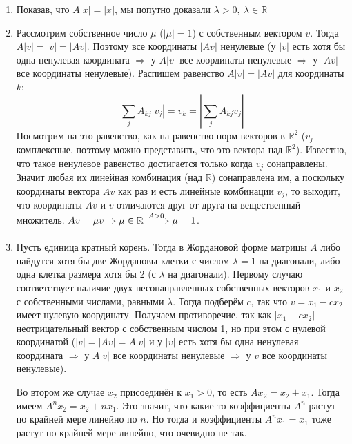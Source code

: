 \begin{enumerate}
  	\item Показав, что $ A|x| = |x| $, мы попутно доказали $ \lambda > 0,\ \lambda \in \mathbb{R} $
  	\item Рассмотрим собственное число $ \mu $ ($ |\mu| = 1 $) с собственным вектором $ v $. Тогда $ A|v|=|v|=|Av| $. Поэтому все координаты $ |Av| $ ненулевые (у $ |v| $ есть хотя бы одна ненулевая координата $ \Rightarrow $ у $ A|v| $ все координаты ненулевые $ \Rightarrow $ у $ |Av| $ все координаты ненулевые). Распишем равенство $ A|v| = |Av| $ для координаты $ k $: 
  	$$ \sum\limits_{j} A_{kj} |v_j| = v_k = |\sum\limits_{j} A_{kj} v_j| $$
  	Посмотрим на это равенство, как на равенство норм векторов в $ \mathbb{R}^2 $ ($ v_j $ комплексные, поэтому можно представить, что это вектора над $ \mathbb{R}^2 $). Известно, что такое ненулевое равенство достигается только когда $ v_j $ сонаправлены. Значит любая их линейная комбинация (над $ \mathbb{R} $) сонаправлена им, а поскольку координаты вектора $ Av $ как раз и есть линейные комбинации $ v_j $, то выходит, что координаты $ Av $ и $ v $ отличаются друг от друга на вещественный множитель. $ Av = \mu v \Rightarrow \mu \in \mathbb{R} \xRightarrow{A > 0} \mu = 1 $.
  	\item Пусть единица кратный корень. Тогда в Жордановой форме матрицы $ A $ либо найдутся хотя бы две Жордановы клетки с числом $ \lambda = 1 $ на диагонали, либо одна клетка размера хотя бы 2 (с $ \lambda $ на диагонали). Первому случаю соответствует наличие двух несонаправленных собственных векторов $ x_1 $ и $ x_2 $ с собственными числами, равными $\lambda$. Тогда подберём $ c $, так что $ v = x_1 - c x_2 $ имеет нулевую координату. Получаем противоречие, так как $|x_1 - c x_2|$ -- неотрицательный вектор с собственным числом 1, но при этом с нулевой координатой ($ |v| = |Av| = A|v|$ и у $ |v| $ есть хотя бы одна ненулевая координата $ \Rightarrow $ у $ A|v| $ все координаты ненулевые $ \Rightarrow $ у $ v $ все координаты ненулевые).

  	Во втором же случае $ x_2 $ присоединён к $ x_1 > 0 $, то есть $ A x_2 = x_2 + x_1 $. Тогда имеем $ A^n x_2 = x_2 + n x_1 $. Это значит, что какие-то коэффициенты $ A^n $ растут по крайней мере линейно по $ n $. Но тогда и коэффициенты $ A^n x_1 = x_1 $ тоже растут по крайней мере линейно, что очевидно не так.
  \end{enumerate}
\endproof